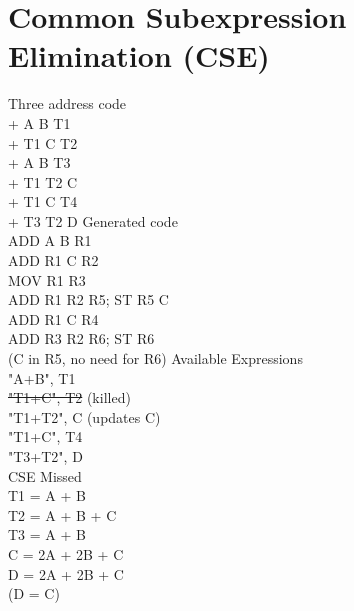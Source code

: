 \documentclass{report}
\begin{document}
\section{Common Subexpression Elimination (CSE)}
\vspace{-1em}
\begin{multicols}{4}
Three address code \\
+ A B T1  \\
+ T1 C T2 \\
+ A B T3  \\
+ T1 T2 C \\
+ T1 C T4 \\
+ T3 T2 D
\vfill\columnbreak
Generated code \\
ADD A B R1 \\
ADD R1 C R2 \\
MOV R1 R3 \\
ADD R1 R2 R5; ST R5 C \\
ADD R1 C R4 \\
ADD R3 R2 R6; ST R6 \\
(C in R5, no need for R6)
\vfill\columnbreak
Available Expressions \\
"A+B", T1 \\
\st{"T1+C", T2} (killed) \\

"T1+T2", C  (updates C) \\
"T1+C", T4 \\
"T3+T2", D \\
\vfill\columnbreak
CSE Missed \\
T1 = A + B \\
T2 = A + B + C \\
T3 = A + B \\
C  = 2A + 2B + C \\

D  = 2A + 2B + C \\
(D = C)
\end{multicols}
\end{document}
